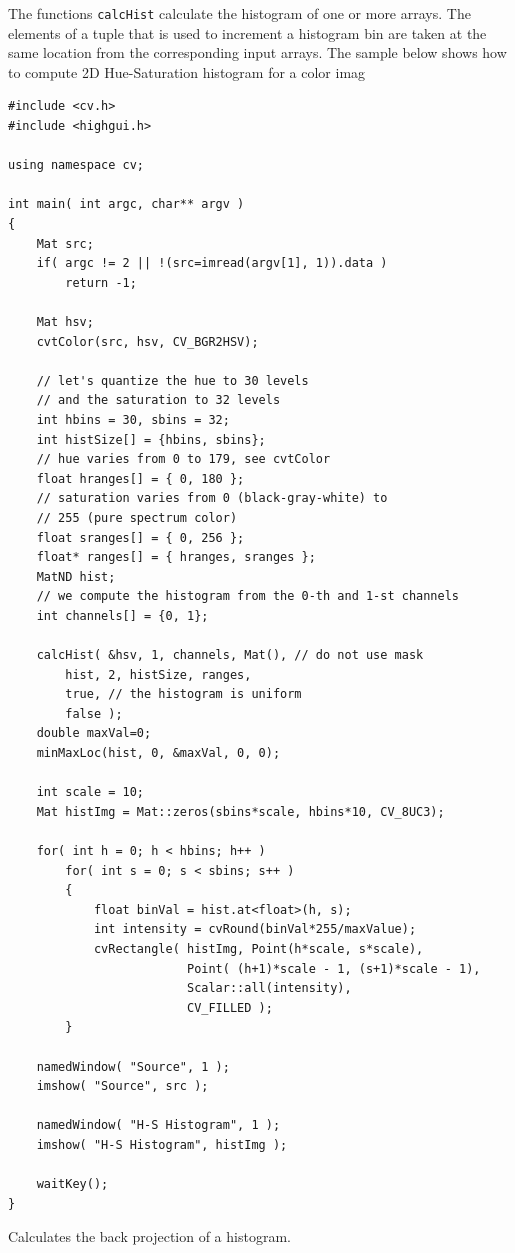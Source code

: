 The functions \texttt{calcHist} calculate the histogram of one or more
arrays. The elements of a tuple that is used to increment
a histogram bin are taken at the same location from the corresponding
input arrays. The sample below shows how to compute 2D Hue-Saturation histogram for a color imag

\begin{lstlisting}
#include <cv.h>
#include <highgui.h>

using namespace cv;

int main( int argc, char** argv )
{
    Mat src;
    if( argc != 2 || !(src=imread(argv[1], 1)).data )
        return -1;

    Mat hsv;
    cvtColor(src, hsv, CV_BGR2HSV);

    // let's quantize the hue to 30 levels
    // and the saturation to 32 levels
    int hbins = 30, sbins = 32;
    int histSize[] = {hbins, sbins};
    // hue varies from 0 to 179, see cvtColor
    float hranges[] = { 0, 180 };
    // saturation varies from 0 (black-gray-white) to
    // 255 (pure spectrum color)
    float sranges[] = { 0, 256 };
    float* ranges[] = { hranges, sranges };
    MatND hist;
    // we compute the histogram from the 0-th and 1-st channels
    int channels[] = {0, 1};
    
    calcHist( &hsv, 1, channels, Mat(), // do not use mask
        hist, 2, histSize, ranges,
        true, // the histogram is uniform
        false );
    double maxVal=0;
    minMaxLoc(hist, 0, &maxVal, 0, 0);
    
    int scale = 10;
    Mat histImg = Mat::zeros(sbins*scale, hbins*10, CV_8UC3);        

    for( int h = 0; h < hbins; h++ )
        for( int s = 0; s < sbins; s++ )
        {
            float binVal = hist.at<float>(h, s);
            int intensity = cvRound(binVal*255/maxValue);
            cvRectangle( histImg, Point(h*scale, s*scale),
                         Point( (h+1)*scale - 1, (s+1)*scale - 1),
                         Scalar::all(intensity),
                         CV_FILLED );
        }

    namedWindow( "Source", 1 );
    imshow( "Source", src );

    namedWindow( "H-S Histogram", 1 );
    imshow( "H-S Histogram", histImg );

    waitKey();
}
\end{lstlisting}


Calculates the back projection of a histogram.

